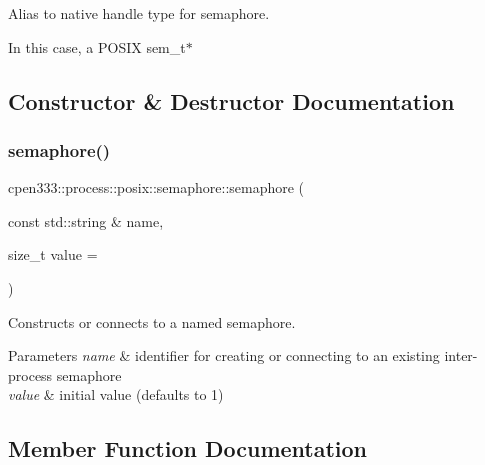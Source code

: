 Alias to native handle type for semaphore. 

In this case, a P\+O\+S\+IX sem\+\_\+t$\ast$ 

\subsection{Constructor \& Destructor Documentation}
\mbox{\label{classcpen333_1_1process_1_1posix_1_1semaphore_aee6d65abd5bbfcfd1629140cb20c8ad1}} 
\subsubsection{\texorpdfstring{semaphore()}{semaphore()}}
{\footnotesize\ttfamily cpen333\+::process\+::posix\+::semaphore\+::semaphore (\begin{DoxyParamCaption}\item[{const std\+::string \&}]{name,  }\item[{size\+\_\+t}]{value = {} }\end{DoxyParamCaption})\hspace{0.3cm}{\ttfamily [inline]}}



Constructs or connects to a named semaphore. 


\begin{DoxyParams}{Parameters}
{\em name} & identifier for creating or connecting to an existing inter-\/process semaphore \\
\hline
{\em value} & initial value (defaults to 1) \\
\hline
\end{DoxyParams}


\subsection{Member Function Documentation}
\mbox{\label{classcpen333_1_1process_1_1posix_1_1semaphore_a1e4a2d5a032a71fc06a5065f0e83a94c}} 

